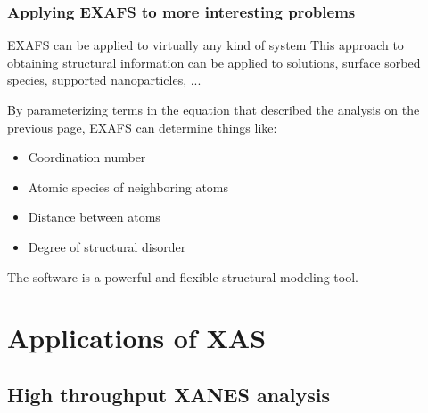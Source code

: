 \documentclass[10pt, xcolor=x11names, compress, handout]{beamer}
\begin{document}
\begin{frame}
  \frametitle{Applying EXAFS to more interesting problems}
  \begin{block}{EXAFS can be applied to virtually any kind of system}
    This approach to obtaining structural information can be applied
    to solutions, surface sorbed species, supported nanoparticles, ...
  \end{block}

  By parameterizing terms in the equation that described the analysis
  on the previous page, EXAFS can determine things like:

  \medskip

  \begin{itemize}
  \item Coordination number
  \item Atomic species of neighboring atoms
  \item Distance between atoms
  \item Degree of structural disorder
  \end{itemize}

  \medskip

  The software is a powerful and flexible structural modeling tool.
\end{frame}


\section[XAS Applications]{Applications of XAS}

\subsection[High throughout]{High throughput XANES analysis}
\end{document}
